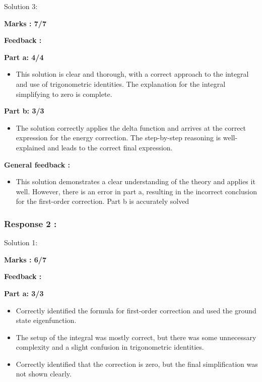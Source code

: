 \documentclass[a4paper,11pt]{article}
\begin{document}
Solution 3:


\textbf{ Marks : 7/7}

\textbf{Feedback :}

\textbf{Part a: 4/4}

\begin{itemize}
    \item This solution is clear and thorough, with a correct approach to the integral and use of trigonometric identities. The explanation for the integral simplifying to zero is complete.
\end{itemize}

\textbf{Part b: 3/3}
\begin{itemize}
    \item The solution correctly applies the delta function and arrives at the correct expression for the energy correction. The step-by-step reasoning is well-explained and leads to the correct final expression.
\end{itemize}

\textbf{General feedback :}

\begin{itemize}
    \item This solution demonstrates a clear understanding of the theory and applies it well. However, there is an error in part a, resulting in the incorrect conclusion for the first-order correction. Part b is accurately solved
\end{itemize}


\subsubsection*{Response 2 :}


Solution 1:


\textbf{ Marks : 6/7}

\textbf{Feedback :}

\textbf{Part a: 3/3}

\begin{itemize}
    \item Correctly identified the formula for first-order correction and used the ground state eigenfunction.
    \item The setup of the integral was mostly correct, but there was some unnecessary complexity and a slight confusion in trigonometric identities.
    \item Correctly identified that the correction is zero, but the final simplification was not shown clearly.
\end{itemize}
\end{document}
